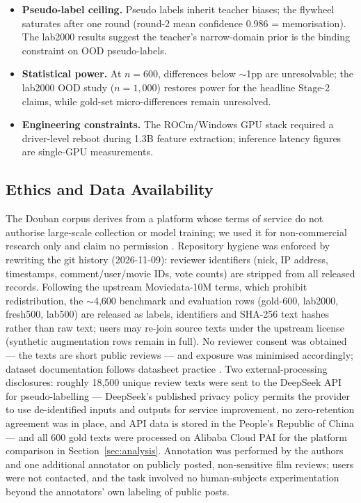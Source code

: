 \documentclass[11pt,a4paper]{article}
\newcommand{\code}[1]{\texttt{#1}}
\begin{document}
\begin{itemize}
        interface (anchoring risk, Section~\ref{sec:lab2000-data}) ---
        and a 200-row second-human IAA sample ($\kappa = 0.57$, a
        blended human-vs-reference figure, not pure human IAA).
        Consensus labels are reliable but not infallible; per-row
        \code{final\_source} is released.
  \item \textbf{Pseudo-label ceiling.} Pseudo labels inherit teacher
        biases; the flywheel saturates after one round (round-2 mean
        confidence 0.986 = memorisation). The lab2000 results suggest
        the teacher's narrow-domain prior is the binding constraint on
        OOD pseudo-labels.
  \item \textbf{Statistical power.} At $n=600$, differences below
        $\sim$1pp are unresolvable; the lab2000 OOD study ($n=1{,}000$)
        restores power for the headline Stage-2 claims, while
        gold-set micro-differences remain unresolved.
  \item \textbf{Engineering constraints.} The ROCm/Windows GPU stack
        required a driver-level reboot during 1.3B feature extraction;
        inference latency figures are single-GPU measurements.
\end{itemize}

\subsection{Ethics and Data Availability}
\label{sec:ethics}

The Douban corpus derives from a platform whose terms of service do
not authorise large-scale collection or model training; we used it
for non-commercial research only and claim no permission
\citep{bender2018}. Repository hygiene was enforced by rewriting the
git history (2026-11-09): reviewer identifiers (nick, IP address,
timestamps, comment/user/movie IDs, vote counts) are stripped from
all released records. Following the upstream Moviedata-10M terms,
which prohibit redistribution, the $\sim$4{,}600 benchmark and
evaluation rows (gold-600, lab2000, fresh500, lab500) are released
as labels, identifiers and SHA-256 text hashes rather than raw
text; users may re-join source texts under the upstream license
(synthetic augmentation rows remain in full). No reviewer consent
was obtained --- the texts are short public reviews --- and exposure
was minimised accordingly; dataset documentation follows datasheet
practice \citep{gebru2021}. Two external-processing disclosures:
roughly 18{,}500 unique review texts were sent to the DeepSeek API
for pseudo-labelling --- DeepSeek's published privacy policy permits
the provider to use de-identified inputs and outputs for service
improvement, no zero-retention agreement was in place, and API data
is stored in the People's Republic of China --- and all 600 gold
texts were processed on Alibaba Cloud PAI for the platform
comparison in Section~\ref{sec:analysis}. Annotation was performed
by the authors and one additional annotator on publicly posted,
non-sensitive film reviews; users were not contacted, and the task
involved no human-subjects experimentation beyond the annotators'
own labeling of public posts.
\end{document}
